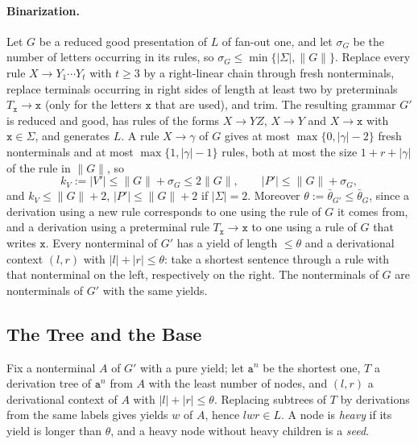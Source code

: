 \documentclass[11pt]{article}
\numberwithin{equation}{section}
\theoremstyle{plain}
\theoremstyle{definition}
\theoremstyle{remark}
\theoremstyle{plain}
\begin{document}
\paragraph{Binarization.}
Let $G$ be a reduced good presentation of $L$ of fan-out one, and let
$\sigma_G$ be the number of letters occurring in its rules, so
$\sigma_G\le\min\{|\Sigma|,\|G\|\}$.  Replace every rule $X\to Y_1\cdots Y_t$
with $t\ge3$ by a right-linear chain through fresh nonterminals, replace
terminals occurring in right sides of length at least two by preterminals
$T_{\mathtt x}\to\mathtt x$ (only for the letters $\mathtt x$ that are used), and trim.
The resulting grammar $G'$ is reduced and good, has rules of the forms
$X\to YZ$, $X\to Y$ and $X\to\mathtt x$ with $\mathtt x\in\Sigma$, and generates $L$.
A rule $X\to\gamma$ of $G$ gives at most $\max\{0,|\gamma|-2\}$ fresh
nonterminals and at most $\max\{1,|\gamma|-1\}$ rules, both at most the size
$1+r+|\gamma|$ of the rule in $\|G\|$, so
\[
 k_V:=|V'|\le\|G\|+\sigma_G\le2\|G\|,\qquad |P'|\le\|G\|+\sigma_G,
\]
and $k_V\le\|G\|+2$, $|P'|\le\|G\|+2$ if $|\Sigma|=2$.  Moreover
$\theta:=\bar\theta_{G'}\le\bar\theta_G$, since a derivation using a new rule
corresponds to one using the rule of $G$ it comes from, and a derivation using a
preterminal rule $T_{\mathtt x}\to\mathtt x$ to one using a rule of $G$ that writes
$\mathtt x$.  Every nonterminal of
$G'$ has a yield of length $\le\theta$ and a derivational context $(l,r)$ with
$|l|+|r|\le\theta$: take a shortest sentence through a rule with that
nonterminal on the left, respectively on the right.  The nonterminals of $G$
are nonterminals of $G'$ with the same yields.

\subsection{The Tree and the Base}

Fix a nonterminal $A$ of $G'$ with a pure yield; let $\mathtt a^n$ be the
shortest one, $T$ a derivation tree of $\mathtt a^n$ from $A$ with the least
number of nodes, and $(l,r)$ a derivational context of $A$ with
$|l|+|r|\le\theta$.  Replacing subtrees of $T$ by derivations from the same
labels gives yields $w$ of $A$, hence $lwr\in L$.  A node is \emph{heavy} if
its yield is longer than $\theta$, and a heavy node without heavy children is a
\emph{seed}.
\end{document}
